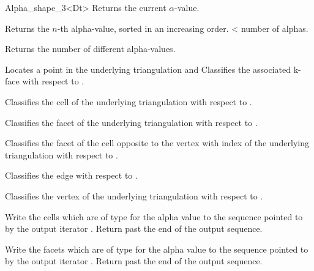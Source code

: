 \begin{ccRefClass} {Alpha_shape_3<Dt>}
{Returns the current $\alpha$-value.}

{Returns the $n$-th alpha-value, sorted in an increasing order.
 \ccPrecond {} < number of alphas.}

{Returns the number of different alpha-values.}

{Locates a point   in the underlying triangulation and Classifies the 
associated k-face with respect to .}

{Classifies the cell  of the underlying triangulation with
respect 
to .}

{Classifies the facet  of the underlying triangulation with
respect to .}

{Classifies the facet of the cell  opposite to the vertex with index
of the underlying triangulation with respect to .}

{Classifies the edge  with respect to  . }

{Classifies the vertex  of the underlying triangulation with respect to .}

{Write the cells which are of type  for 
the alpha value  to the sequence
pointed to by the output iterator . Return past the end
of the output sequence.}


{Write the facets which are of type  for 
the alpha value  to the sequence
pointed to by the output iterator . Return past the end
of the output sequence.}


\end{ccRefClass}
